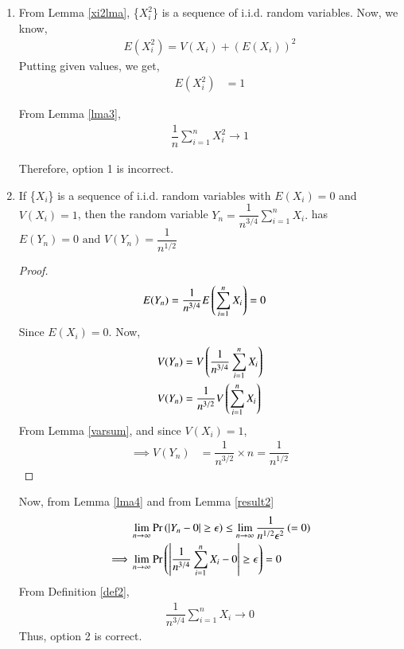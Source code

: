 \documentclass[journal,12pt,twocolumn]{IEEEtran}
\begin{document}
\begin{enumerate}
\item 
From Lemma \ref{xi2lma}, \{$X_i^2$\} is a sequence of i.i.d. random variables.
Now, we know,
\begin{align}
    E(X_i^2)=V(X_i)+(E(X_i))^2
\end{align}
Putting given values, we get,
\begin{align} 
    E(X_i^2)&=1 \label{muval}
\end{align}

From Lemma \ref{lma3},  
\begin{align} \label{opt4}
   \dfrac{1}{n}\sum_{i=1}^n X_i^2 \to 1
\end{align}

Therefore, option 1 is incorrect.

\item 
\begin{lemma} \label{result2}
   If \{$X_i$\} is a sequence of i.i.d. random variables with $E(X_i)=0$ and $V(X_i)=1$, then the random variable \begin{math} Y_n=\dfrac{1}{n^{3/4}}\sum_{i=1}^n X_i.\end{math} has \begin{math} E(Y_n) = 0 \text{ and } V(Y_n) = \dfrac{1}{n^{1/2}} \end{math}
\end{lemma}

\begin{proof}
\begin{align}
    E(Y_n) &= \dfrac{1}{n^{3/4}}E\left(\sum_{i=1}^n X_i\right) = 0
\end{align}
Since $E(X_i) = 0$. Now, 
\begin{align}
    V(Y_n) &= V\left(\dfrac{1}{n^{3/4}}\sum_{i=1}^n X_i\right) \\
    V(Y_n) &= \dfrac{1}{n^{3/2}} V\left(\sum_{i=1}^n X_i\right)
\end{align}
From Lemma \ref{varsum}, and since $V(X_i)=1$, 
\begin{align}
    \implies V(Y_n) &= \dfrac{1}{n^{3/2}} \times n = \dfrac{1}{n^{1/2}}
\end{align}
\end{proof}

Now, from Lemma \ref{lma4} and from Lemma \ref{result2}
\begin{align}
    &\lim_{n \to \infty}\Pr\left(|Y_n-0|\geq \epsilon\right) \leq \lim_{n \to \infty }\dfrac{1}{n^{1/2}\epsilon^2}\left(=0\right)\\
    \implies &\lim_{n \to \infty}\Pr\left(\left | \dfrac{1}{n^{3/4}}\sum_{i=1}^n X_i - 0 \right|\geq \epsilon\right)=0
\end{align}
From Definition \ref{def2},
\begin{align}
    \dfrac{1}{n^{3/4}}\sum_{i=1}^n X_i \to 0
\end{align}
Thus, option 2 is correct.


\end{enumerate}
\end{document}
